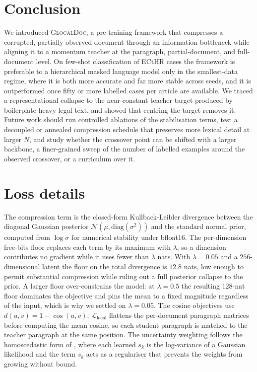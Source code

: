 \documentclass[conference]{IEEEtran}
\newcommand{\glocal}{\textsc{GlocalDoc}}
\begin{document}
\section{Conclusion}
We introduced \glocal{}, a pre-training framework that compresses a corrupted,
partially observed document through an information bottleneck while aligning it to a
momentum teacher at the paragraph, partial-document, and full-document level. On
few-shot classification of ECtHR cases the framework is preferable to a hierarchical
masked language model only in the smallest-data regime, where it is both more
accurate and far more stable across seeds, and it is outperformed once fifty or more
labelled cases per article are available. We traced a representational collapse to
the near-constant teacher target produced by boilerplate-heavy legal text, and
showed that centring the target removes it. Future work should run controlled
ablations of the stabilisation terms, test a decoupled or annealed compression
schedule that preserves more lexical detail at larger $N$, and study whether the
crossover point can be shifted with a larger backbone, a finer-grained sweep of the
number of labelled examples around the observed crossover, or a curriculum over it.

\appendices

\section{Loss details}
\label{app:loss}
The compression term is the closed-form Kullback-Leibler divergence between the
diagonal Gaussian posterior $\mathcal{N}(\mu, \mathrm{diag}(\sigma^2))$ and the
standard normal prior, computed from $\log\sigma$ for numerical stability under
bfloat16. The per-dimension free-bits floor replaces each term by its maximum with
$\lambda$, so a dimension contributes no gradient while it uses fewer than $\lambda$
nats. With $\lambda = 0.05$ and a $256$-dimensional latent the floor on the total
divergence is $12.8$ nats, low enough to permit substantial compression while ruling
out a full posterior collapse to the prior. A larger floor over-constrains the
model: at $\lambda = 0.5$ the resulting $128$-nat floor dominates the objective and
pins the mean to a fixed magnitude regardless of the input, which is why we settled
on $\lambda = 0.05$. The cosine objectives use
$d(u,v) = 1 - \cos(u,v)$; $\mathcal{L}_{\mathrm{local}}$ flattens the per-document
paragraph matrices before computing the mean cosine, so each student paragraph is
matched to the teacher paragraph at the same position. The uncertainty weighting
follows the homoscedastic form of \cite{kendall2018multi}, where each learned $s_k$
is the log-variance of a Gaussian likelihood and the term $s_k$ acts as a
regulariser that prevents the weights from growing without bound.
\end{document}

